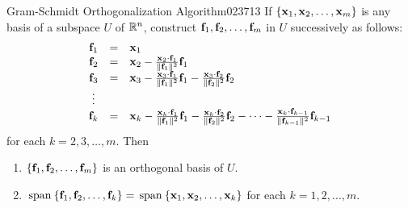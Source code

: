 \newpage 
\begin{wrapfigure}[4]{l}{5cm} 
\vspace*{5em}
\centering

\end{wrapfigure}
\hfill
\begin{theorem}{Gram-Schmidt Orthogonalization Algorithm\footnotemark}{023713}
If $\{\textbf{x}_{1}, \textbf{x}_{2}, \dots , \textbf{x}_{m}\}$ is any basis of a subspace $U$ of $\mathbb{R}^n$, construct $\textbf{f}_{1}, \textbf{f}_{2}, \dots , \textbf{f}_{m}$ in $U$ successively as follows:
\begin{equation*}
\begin{array}{ccl}
\textbf{f}_{1} &=& \textbf{x}_{1} \\
\textbf{f}_{2} &=& \textbf{x}_{2} - \tfrac{\textbf{x}_{2} \cdot \textbf{f}_{1}}{\| \textbf{f}_{1} \|^2}\textbf{f}_{1} \\
\textbf{f}_{3} &=& \textbf{x}_{3} - \tfrac{\textbf{x}_{3} \cdot \textbf{f}_{1}}{\| \textbf{f}_{1} \|^2}\textbf{f}_{1} - \tfrac{\textbf{x}_{3} \cdot \textbf{f}_{2}}{\| \textbf{f}_{2} \|^2}\textbf{f}_{2} \\
\vdots &&\\
\textbf{f}_{k} &=& \textbf{x}_{k} - \tfrac{\textbf{x}_{k} \cdot \textbf{f}_{1}}{\| \textbf{f}_{1} \|^2}\textbf{f}_{1} - \tfrac{\textbf{x}_{k} \cdot \textbf{f}_{2}}{\| \textbf{f}_{2} \|^2}\textbf{f}_{2} - \dots -\tfrac{\textbf{x}_{k} \cdot \textbf{f}_{k-1}}{\| \textbf{f}_{k-1} \|^2}\textbf{f}_{k-1}
\end{array}
\end{equation*}
for each $k = 2, 3, \dots , m$. Then
\begin{enumerate}
\item $\{\textbf{f}_{1}, \textbf{f}_{2}, \dots , \textbf{f}_{m}\}$ is an orthogonal basis of $U$.

\item $\thinspace\operatorname{span\medspace}\{\textbf{f}_{1}, \textbf{f}_{2}, \dots , \textbf{f}_{k}\} = \thinspace\operatorname{span\medspace}\{\textbf{x}_{1}, \textbf{x}_{2}, \dots , \textbf{x}_{k}\}$ for each $k = 1, 2, \dots , m$.

\end{enumerate}
\end{theorem}


